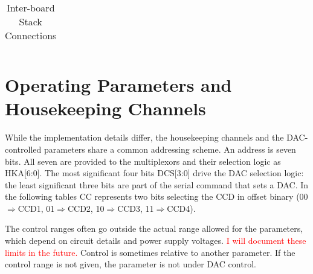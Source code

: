 \documentclass[12pt]{article}
\let\oldsection\section
\renewcommand{\section}{\FloatBarrier\oldsection}
\begin{document}
\tiny{
    \begin{longtable}{|m{}|m{}|m{}|m{}|m{}|m{}|m{}|m{}|@{}m{0pt}@{}}
    \caption{Inter-board Stack Connections} \label{Stack} \\
    \hline
    
    \end{longtable}
}

\normalsize

\section{Operating Parameters and Housekeeping Channels}
\label{param}

While the implementation details differ, the housekeeping channels and the DAC-controlled parameters share a common addressing scheme. An address is seven bits. All seven are provided to the multiplexors and their selection logic as HKA[6:0]. The most significant four bits DCS[3:0] drive the DAC selection logic: the least significant three bits are part of the serial command that sets a DAC. In the following tables CC represents two bits selecting the CCD in offset binary (00$\Rightarrow$CCD1, 01$\Rightarrow$CCD2, 10$\Rightarrow$CCD3, 11$\Rightarrow$CCD4).

The control ranges often go outside the actual range allowed for the parameters, which depend on circuit details and power supply voltages. \textcolor{red}{I will document these limits in the future.} Control is sometimes relative to another parameter. If the control range is not given, the parameter is not under DAC control.
\end{document}
